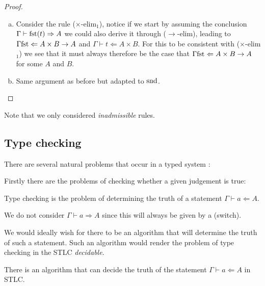 \begin{proof}
\begin{enumerate}[(a)]
        \item Consider the rule ($\times$-elim${}_1$), notice if we start by assuming the conclusion $\Gamma \vdash \mathrm{fst} (t) \Rightarrow A$ we could also derive it through ($\to$-elim), leading to $\Gamma \mathrm{fst} \Leftarrow A \times B \to A$ and $\Gamma \vdash t \Leftarrow A \times B$. For this to be consistent with ($\times$-elim${}_1$) we see that it must always therefore be the case that $\Gamma \mathrm{fst} \Leftarrow A \times B \to A$ for some $A$ and $B$.
        \item Same argument as before but adapted to $\mathrm{snd}$. 
    \end{enumerate}
\end{proof}

\begin{remark}
    Note that we only considered \emph{inadmissible} rules.
\end{remark}

\subsection{Type checking}

There are several natural problems that occur in a typed system \cite{BarendregtHenk2013Lcwt}:

Firstly there are the problems of checking whether a given judgement is true:

\begin{defin}
    Type checking is the problem of determining the truth of a statement $\Gamma \vdash a \Leftarrow A$.
\end{defin}

\begin{remark}
    We do not consider $\Gamma \vdash a \Rightarrow A$ since this will always be given by a (switch).
\end{remark}

We would ideally wish for there to be an algorithm that will determine the truth of such a statement. Such an algorithm would render the problem of type checking in the STLC \emph{decidable}.

\begin{theorem}
    There is an algorithm that can decide the truth of the statement $\Gamma \vdash a \Leftarrow A$ in STLC.
\end{theorem}

